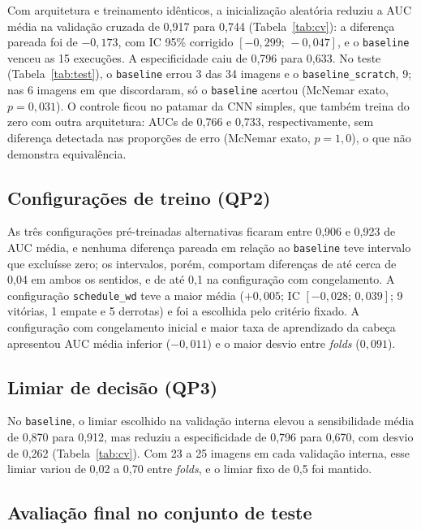 \documentclass[conference]{IEEEtran}
\begin{document}
Com arquitetura e treinamento idênticos, a inicialização aleatória reduziu a AUC média na validação cruzada de 0,917 para 0,744 (Tabela~\ref{tab:cv}): a diferença pareada foi de $-0{,}173$, com IC 95\% corrigido $[-0{,}299;\,-0{,}047]$, e o \texttt{baseline} venceu as 15 execuções. A especificidade caiu de 0,796 para 0,633. No teste (Tabela~\ref{tab:test}), o \texttt{baseline} errou 3 das 34 imagens e o \texttt{baseline\_scratch}, 9; nas 6 imagens em que discordaram, só o \texttt{baseline} acertou (McNemar exato, $p=0{,}031$). O controle ficou no patamar da CNN simples, que também treina do zero com outra arquitetura: AUCs de 0,766 e 0,733, respectivamente, sem diferença detectada nas proporções de erro (McNemar exato, $p=1{,}0$), o que não demonstra equivalência.



\subsection{Configurações de treino (QP2)}

As três configurações pré-treinadas alternativas ficaram entre 0,906 e 0,923 de AUC média, e nenhuma diferença pareada em relação ao \texttt{baseline} teve intervalo que excluísse zero; os intervalos, porém, comportam diferenças de até cerca de 0,04 em ambos os sentidos, e de até 0,1 na configuração com congelamento. A configuração \texttt{schedule\_wd} teve a maior média ($+0{,}005$; IC $[-0{,}028;\,0{,}039]$; 9 vitórias, 1 empate e 5 derrotas) e foi a escolhida pelo critério fixado. A configuração com congelamento inicial e maior taxa de aprendizado da cabeça apresentou AUC média inferior ($-0{,}011$) e o maior desvio entre \textit{folds} ($0{,}091$).

\subsection{Limiar de decisão (QP3)}

No \texttt{baseline}, o limiar escolhido na validação interna elevou a sensibilidade média de 0,870 para 0,912, mas reduziu a especificidade de 0,796 para 0,670, com desvio de 0,262 (Tabela~\ref{tab:cv}). Com 23 a 25 imagens em cada validação interna, esse limiar variou de 0,02 a 0,70 entre \textit{folds}, e o limiar fixo de 0,5 foi mantido.

\subsection{Avaliação final no conjunto de teste}
\end{document}
